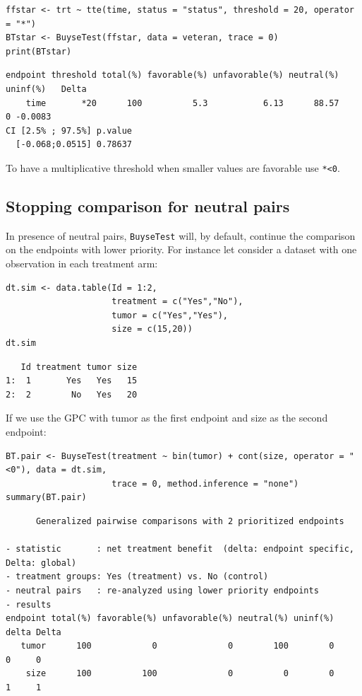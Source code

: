 \documentclass[12pt]{article}
\begin{document}
\lstset{language=r,label= ,caption= ,captionpos=b,numbers=none}
\begin{lstlisting}
ffstar <- trt ~ tte(time, status = "status", threshold = 20, operator = "*")
BTstar <- BuyseTest(ffstar, data = veteran, trace = 0)
print(BTstar)
\end{lstlisting}

\begin{verbatim}
endpoint threshold total(%) favorable(%) unfavorable(%) neutral(%) uninf(%)   Delta
    time       *20      100          5.3           6.13      88.57        0 -0.0083
CI [2.5% ; 97.5%] p.value
  [-0.068;0.0515] 0.78637
\end{verbatim}


To have a multiplicative threshold when smaller values are favorable use \texttt{*<0}.

\clearpage

\subsection{Stopping comparison for neutral pairs}
\label{sec:orgaa9eaa5}
In presence of neutral pairs, \texttt{BuyseTest} will, by default, continue
the comparison on the endpoints with lower priority. For instance let
consider a dataset with one observation in each treatment arm:
\lstset{language=r,label= ,caption= ,captionpos=b,numbers=none}
\begin{lstlisting}
dt.sim <- data.table(Id = 1:2,
                     treatment = c("Yes","No"),
                     tumor = c("Yes","Yes"),
                     size = c(15,20))
dt.sim
\end{lstlisting}

\begin{verbatim}
   Id treatment tumor size
1:  1       Yes   Yes   15
2:  2        No   Yes   20
\end{verbatim}


\bigskip

If we use the GPC with tumor as the first endpoint and size as the
second endpoint:
\lstset{language=r,label= ,caption= ,captionpos=b,numbers=none}
\begin{lstlisting}
BT.pair <- BuyseTest(treatment ~ bin(tumor) + cont(size, operator = "<0"), data = dt.sim,
                     trace = 0, method.inference = "none")
summary(BT.pair)
\end{lstlisting}

\begin{verbatim}
      Generalized pairwise comparisons with 2 prioritized endpoints

- statistic       : net treatment benefit  (delta: endpoint specific, Delta: global) 
- treatment groups: Yes (treatment) vs. No (control) 
- neutral pairs   : re-analyzed using lower priority endpoints
- results
endpoint total(%) favorable(%) unfavorable(%) neutral(%) uninf(%) delta Delta
   tumor      100            0              0        100        0     0     0
    size      100          100              0          0        0     1     1
\end{verbatim}
\end{document}
